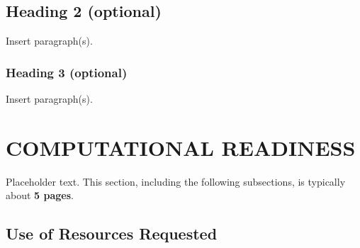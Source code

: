 \documentclass[11pt,letterpaper,english]{article}
\begin{document}
\vspace{-.25in}
\subsection{Heading 2 (optional)}
\vspace{-.2in}

Insert paragraph(s).

\vspace{-.25in}
\subsubsection{Heading 3 (optional)}
\vspace{-.2in}

Insert paragraph(s).

\vspace{-.25in}
\section{COMPUTATIONAL READINESS}
\vspace{-.2in}

Placeholder text. This section, including the following subsections, is typically about \textbf{5 pages}.

\vspace{-.25in}
\subsection{Use of Resources Requested}
\vspace{-.2in}
\end{document}
